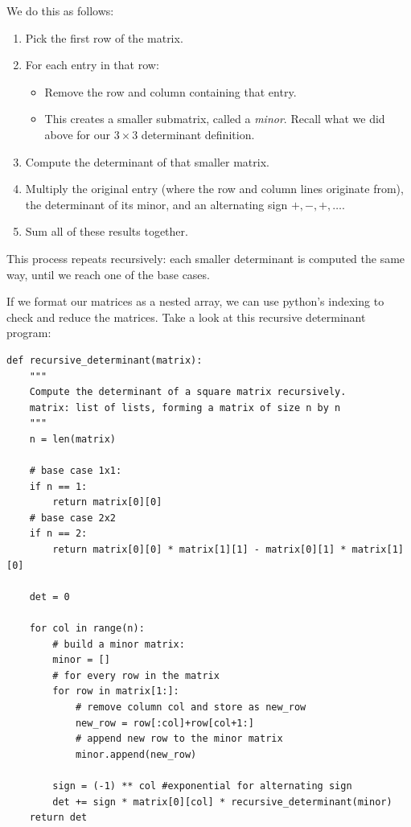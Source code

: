 We do this as follows:
\begin{enumerate}
    \item Pick the first row of the matrix.
    
    \item For each entry in that row:
    \begin{itemize}
        \item Remove the row and column containing that entry.
        \item This creates a smaller submatrix, called a \emph{minor}. Recall what we did above for our $3\times 3$ determinant definition. 
    \end{itemize}
    \item Compute the determinant of that smaller matrix.
    \item Multiply the original entry (where the row and column lines originate from), the determinant of its minor, and an alternating sign $+, -, +, \dots$.
    \item Sum all of these results together.
\end{enumerate}
    
This process repeats recursively: each smaller determinant is computed the same way, until we reach one of the base cases.

If we format our matrices as a nested array, we can use python's indexing to check and reduce the matrices. Take a look at this recursive determinant program:
\begin{verbatim}
def recursive_determinant(matrix):
    """
    Compute the determinant of a square matrix recursively.
    matrix: list of lists, forming a matrix of size n by n
    """
    n = len(matrix)
    
    # base case 1x1:
    if n == 1:
        return matrix[0][0]
    # base case 2x2
    if n == 2:
        return matrix[0][0] * matrix[1][1] - matrix[0][1] * matrix[1][0]
    
    det = 0
    
    for col in range(n):
        # build a minor matrix:
        minor = []
        # for every row in the matrix
        for row in matrix[1:]:
            # remove column col and store as new_row
            new_row = row[:col]+row[col+1:]
            # append new row to the minor matrix
            minor.append(new_row)
    
        sign = (-1) ** col #exponential for alternating sign
        det += sign * matrix[0][col] * recursive_determinant(minor)
    return det
\end{verbatim}

